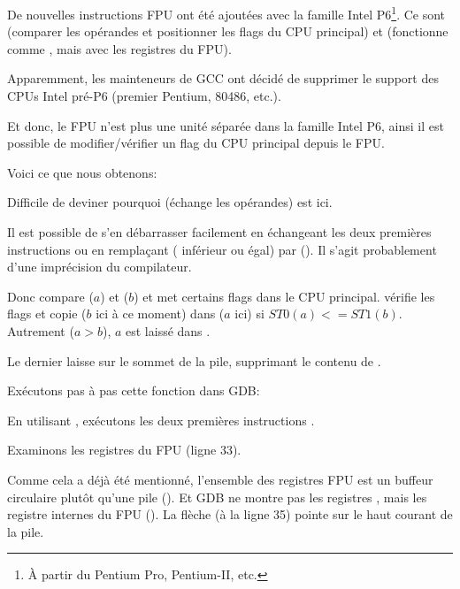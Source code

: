 \label{gcc481_o3}

De nouvelles instructions FPU ont été ajoutées avec la famille Intel P6\footnote{À partir du Pentium Pro, Pentium-II, etc.}.
Ce sont  (comparer les opérandes et positionner les flags du CPU principal)
et 
 (fonctionne comme , mais avec les registres du FPU).

Apparemment, les mainteneurs de GCC ont décidé de supprimer le support des CPUs Intel
pré-P6 (premier Pentium, 80486, etc.).

Et donc, le FPU n'est plus une unité séparée dans la famille Intel P6, ainsi il est
possible de modifier/vérifier un flag du CPU principal depuis le FPU.

Voici ce que nous obtenons:



Difficile de deviner pourquoi  (échange les opérandes) est ici.

Il est possible de s'en débarrasser facilement en échangeant les deux premières instructions
\FLD ou en remplaçant  ( inférieur ou égal) par
 ().
Il s'agit probablement d'une imprécision du compilateur.

Donc  compare  ($a$) et  ($b$) et met certains flags
dans le CPU principal.
 vérifie les flags et copie  ($b$ ici à ce moment) dans 
($a$ ici) si $ST0 (a) <= ST1 (b)$.
Autrement ($a>b$), $a$ est laissé dans .

Le dernier \FSTP laisse  sur le sommet de la pile, supprimant le contenu de .

Exécutons pas à pas cette fonction dans GDB:



En utilisant , exécutons les deux premières instructions \FLD.

Examinons les registres du FPU (ligne 33).

Comme cela a déjà été mentionné, l'ensemble des registres FPU est un buffeur
circulaire plutôt qu'une pile ().
Et GDB ne montre pas les registres , mais les registre internes du FPU ().
La flèche (à la ligne 35) pointe sur le haut courant de la pile.


